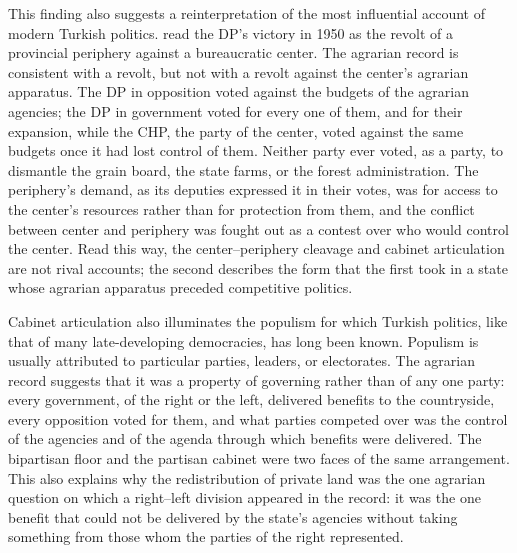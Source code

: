 \documentclass[12pt]{article}
\begin{document}
This finding also suggests a reinterpretation of the most influential account of modern Turkish politics. \citet{mardin1973} read the DP's victory in 1950 as the revolt of a provincial periphery against a bureaucratic center. The agrarian record is consistent with a revolt, but not with a revolt against the center's agrarian apparatus. The DP in opposition voted against the budgets of the agrarian agencies; the DP in government voted for every one of them, and for their expansion, while the CHP, the party of the center, voted against the same budgets once it had lost control of them. Neither party ever voted, as a party, to dismantle the grain board, the state farms, or the forest administration. The periphery's demand, as its deputies expressed it in their votes, was for access to the center's resources rather than for protection from them, and the conflict between center and periphery was fought out as a contest over who would control the center. Read this way, the center--periphery cleavage and cabinet articulation are not rival accounts; the second describes the form that the first took in a state whose agrarian apparatus preceded competitive politics.

Cabinet articulation also illuminates the populism for which Turkish politics, like that of many late-developing democracies, has long been known. Populism is usually attributed to particular parties, leaders, or electorates. The agrarian record suggests that it was a property of governing rather than of any one party: every government, of the right or the left, delivered benefits to the countryside, every opposition voted for them, and what parties competed over was the control of the agencies and of the agenda through which benefits were delivered. The bipartisan floor and the partisan cabinet were two faces of the same arrangement. This also explains why the redistribution of private land was the one agrarian question on which a right--left division appeared in the record: it was the one benefit that could not be delivered by the state's agencies without taking something from those whom the parties of the right represented.
\end{document}
